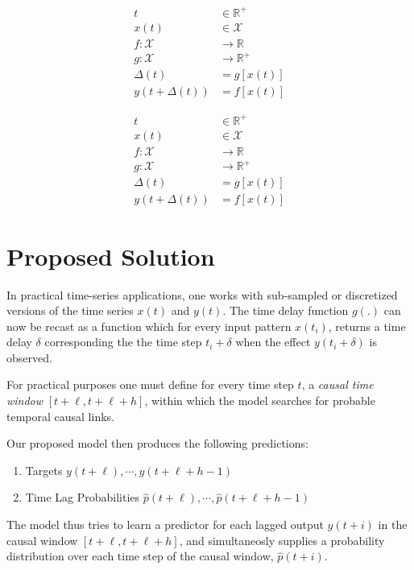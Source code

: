 \documentclass[twoside]{article}
\begin{document}
\begin{align}
t & \in \mathbb{R}^{+}\\
x(t) & \in \mathcal{X} \\
f: \mathcal{X} & \rightarrow \mathbb{R}\\
g: \mathcal{X} & \rightarrow \mathbb{R}^{+}\\
\Delta(t) & = g[x(t)] \\
y(t + \Delta(t)) & = f[x(t)]
\end{align}

\begin{align}
t & \in \mathbb{R}^{+}\\
x(t) & \in \mathcal{X} \\
f: \mathcal{X} & \rightarrow \mathbb{R}\\
g: \mathcal{X} & \rightarrow \mathbb{R}^{+}\\
\Delta(t) & = g[x(t)] \\
y(t + \Delta(t)) & = f[x(t)]

\end{align}



\section{Proposed Solution}

In practical time-series applications, one works with sub-sampled or discretized versions of the time 
series $x(t)$ and $y(t)$. The time delay function $g(.)$ can now be recast as a function which for every
input pattern $x(t_i)$, returns a time delay $\delta$ corresponding the the time step $t_i + \delta$ when
the effect $y(t_i + \delta)$ is observed.

For practical purposes one must define for every time step $t$, a \emph{causal time window} $[t+\ell, t+\ell+h]$, 
within which the model searches for probable temporal causal links.

Our proposed model then produces the following predictions:

\begin{enumerate}
\item Targets $y(t+\ell), \cdots, y(t+\ell+h-1)$
\item Time Lag Probabilities $\hat{p}(t+\ell), \cdots, \hat{p}(t+\ell+h-1)$
\end{enumerate}

The model thus tries to learn a predictor for each lagged output $y(t+i)$ in the 
causal window $[t+\ell, t+\ell+h]$, and simultaneosly supplies a probability distribution 
over each time step of the causal window, $\hat{p}(t+i)$.
\end{document}
